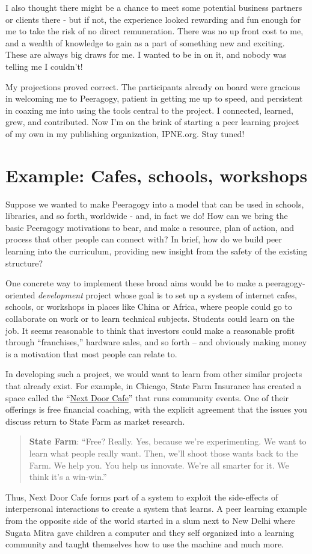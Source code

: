 I also thought there might be a chance to meet some potential business
partners or clients there - but if not, the experience looked rewarding
and fun enough for me to take the risk of no direct remuneration. There
was no up front cost to me, and a wealth of knowledge to gain as a part
of something new and exciting. These are always big draws for me. I
wanted to be in on it, and nobody was telling me I couldn't!

My projections proved correct. The participants already on board were
gracious in welcoming me to Peeragogy, patient in getting me up to
speed, and persistent in coaxing me into using the tools central to the
project. I connected, learned, grew, and contributed. Now I'm on the
brink of starting a peer learning project of my own in my publishing
organization, IPNE.org. Stay tuned!

\section*{Example: Cafes, schools, workshops}

Suppose we wanted to make Peeragogy into a model that can be used in
schools, libraries, and so forth, worldwide - and, in fact we do! How
can we bring the basic Peeragogy motivations to bear, and make a
resource, plan of action, and process that other people can connect
with? In brief, how do we build peer learning into the
curriculum, providing new insight from the safety of the existing
structure?

One concrete way to implement these broad aims would be to make a
peeragogy-oriented \emph{development} project whose goal is to set up a
system of internet cafes, schools, or workshops in places like China or
Africa, where people could go to collaborate on work or to learn
technical subjects. Students could learn on the job. It seems reasonable
to think that investors could make a reasonable profit through
``franchises,'' hardware sales, and so forth -- and obviously making
money is a motivation that most people can relate to.

In developing such a project, we would want to learn from other similar
projects that already exist. For example, in Chicago, State Farm
Insurance has created a space called the
``\href{https://www.nextdoorchi.com/}{Next Door Cafe}'' that runs
community events. One of their offerings is free financial coaching,
with the explicit agreement that the issues you discuss return to State
Farm as market research.

\begin{quote}
\textbf{State Farm}: ``Free? Really. Yes, because we're experimenting.
We want to learn what people really want. Then, we'll shoot those wants
back to the Farm. We help you. You help us innovate. We're all smarter
for it. We think it's a win-win.''
\end{quote}
Thus, Next Door Cafe forms part of a system to exploit the side-effects
of interpersonal interactions to create a system that learns. A peer
learning example from the opposite side of the world started in a slum
next to New Delhi where Sugata Mitra gave children a computer and they
self organized into a learning community and taught themselves how to
use the machine and much more.


